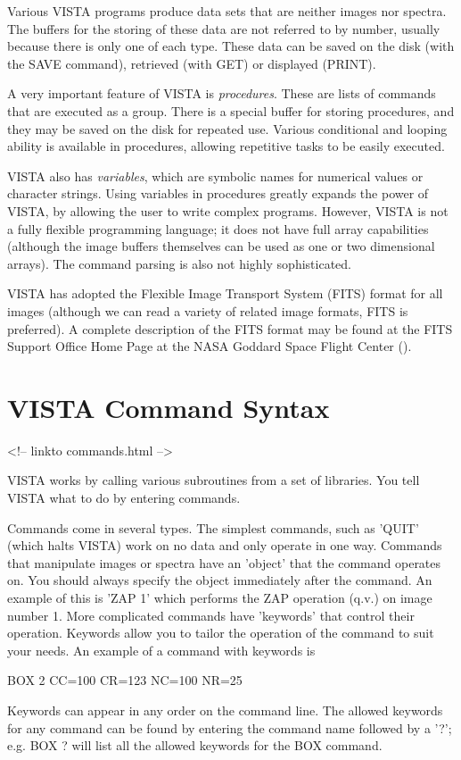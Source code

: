 Various VISTA programs produce data sets that are neither images nor
spectra.  The buffers for the storing of these data are not referred to by
number, usually because there is only one of each type.  These data can be
saved on the disk (with the SAVE command), retrieved (with GET) or
displayed (PRINT).

A very important feature of VISTA is \textit{procedures}.  These are lists
of commands that are executed as a group.  There is a special buffer for
storing procedures, and they may be saved on the disk for repeated
use. Various conditional and looping ability is available in procedures,
allowing repetitive tasks to be easily executed.

VISTA also has \textit{variables}, which are symbolic names for numerical
values or character strings.  Using variables in procedures greatly expands
the power of VISTA, by allowing the user to write complex
programs. However, VISTA is not a fully flexible programming language; it
does not have full array capabilities (although the image buffers
themselves can be used as one or two dimensional arrays). The command
parsing is also not highly sophisticated.

VISTA has adopted the Flexible Image Transport System (FITS) format for all
images (although we can read a variety of related image formats, FITS is
preferred).  A complete description of the FITS format may be found at the
FITS Support Office Home Page at the NASA Goddard Space Flight Center
().

\section{VISTA Command Syntax}
\begin{rawhtml}
<!-- linkto commands.html -->
\end{rawhtml}

VISTA works by calling various subroutines from a set of libraries. You
tell VISTA what to do by entering commands.

Commands come in several types.  The simplest commands, such as 'QUIT'
(which halts VISTA) work on no data and only operate in one way. Commands
that manipulate images or spectra have an 'object' that the command
operates on.  You should always specify the object immediately after the
command.  An example of this is 'ZAP 1' which performs the ZAP operation
(q.v.) on image number 1. More complicated commands have 'keywords' that
control their operation.  Keywords allow you to tailor the operation of the
command to suit your needs. An example of a command with keywords is
\begin{hanging}
   \item{BOX 2 CC=100 CR=123 NC=100 NR=25}
\end{hanging}
Keywords can appear in any order on the command line. The allowed keywords
for any command can be found by entering the command name followed by a
'?'; e.g.  BOX ? will list all the allowed keywords for the BOX command.

